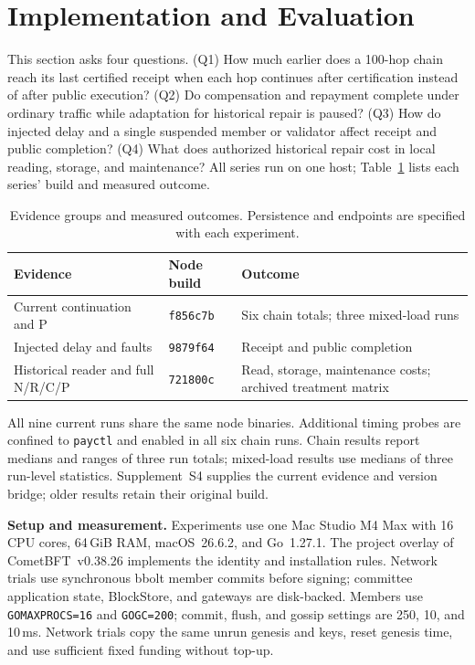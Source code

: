 \section{Implementation and Evaluation}
\label{sec:evaluation}

This section asks four questions. (Q1) How much earlier does a 100-hop
chain reach its last certified receipt when each hop continues after
certification instead of after public execution? (Q2) Do compensation and
repayment complete under ordinary traffic while adaptation for historical
repair is paused? (Q3) How do injected delay and a single suspended member
or validator affect receipt and public completion? (Q4) What does authorized
historical repair cost in local reading, storage, and maintenance? All
series run on one host; Table~\ref{tab:eval-builds} lists each series' build and measured outcome.

\begin{table}[!t]
\caption{Evidence groups and measured outcomes. Persistence and endpoints are specified with each experiment.}
\label{tab:eval-builds}
\centering\small
\setlength{\tabcolsep}{3pt}
\begin{tabular}{@{}p{}p{}p{}@{}}
\toprule
Evidence & Node build & Outcome \\
\midrule
Current continuation and P & \texttt{f856c7b} & Six chain totals; three mixed-load runs \\
Injected delay and faults & \texttt{9879f64} & Receipt and public completion \\
Historical reader and full N/R/C/P & \texttt{721800c} & Read, storage, maintenance costs; archived treatment matrix \\
\bottomrule
\end{tabular}
\end{table}

All nine current runs share the same node binaries. Additional timing probes are confined to \texttt{payctl} and enabled in all six chain runs. Chain results report medians and ranges of three run totals; mixed-load results use medians of three run-level statistics. Supplement~S4 supplies the current evidence and version bridge; older results retain their original build.

\noindent\textbf{Setup and measurement.}
Experiments use one Mac Studio M4 Max with 16 CPU cores, 64\,GiB RAM,
macOS~26.6.2, and Go~1.27.1. The project overlay of CometBFT~v0.38.26
implements the identity and installation rules. Network trials use
synchronous bbolt member commits before signing; committee application
state, BlockStore, and gateways are disk-backed. Members use
\texttt{GOMAXPROCS=16} and \texttt{GOGC=200}; commit, flush, and gossip
settings are 250, 10, and 10\,ms. Network trials copy the same unrun genesis and keys, reset genesis time,
and use sufficient fixed funding without top-up.

